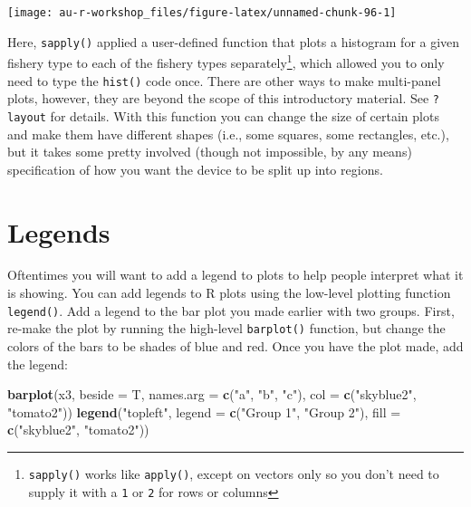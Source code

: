 \documentclass[]{book}
\newenvironment{Shaded}{\begin{snugshade}}{\end{snugshade}}
\newcommand{\KeywordTok}[1]{\textcolor[rgb]{0.13,0.29,0.53}{\textbf{#1}}}
\newcommand{\DataTypeTok}[1]{\textcolor[rgb]{0.13,0.29,0.53}{#1}}
\newcommand{\StringTok}[1]{\textcolor[rgb]{0.31,0.60,0.02}{#1}}
\newcommand{\NormalTok}[1]{#1}
\let\rmarkdownfootnote\footnote%
\def\footnote{\protect\rmarkdownfootnote}
\theoremstyle{definition}
\theoremstyle{definition}
\theoremstyle{definition}
\theoremstyle{remark}
\begin{document}
\begin{center}\texttt{[image: au-r-workshop\_files/figure-latex/unnamed-chunk-96-1]} \end{center}

Here, \texttt{sapply()} applied a user-defined function that plots a
histogram for a given fishery type to each of the fishery types
separately\footnote{\texttt{sapply()} works like \texttt{apply()},
  except on vectors only so you don't need to supply it with a
  \texttt{1} or \texttt{2} for rows or columns}, which allowed you to
only need to type the \texttt{hist()} code once. There are other ways to
make multi-panel plots, however, they are beyond the scope of this
introductory material. See \texttt{?layout} for details. With this
function you can change the size of certain plots and make them have
different shapes (i.e., some squares, some rectangles, etc.), but it
takes some pretty involved (though not impossible, by any means)
specification of how you want the device to be split up into regions.

\section{Legends}\label{legends}

Oftentimes you will want to add a legend to plots to help people
interpret what it is showing. You can add legends to R plots using the
low-level plotting function \texttt{legend()}. Add a legend to the bar
plot you made earlier with two groups. First, re-make the plot by
running the high-level \texttt{barplot()} function, but change the
colors of the bars to be shades of blue and red. Once you have the plot
made, add the legend:

\begin{Shaded}
\begin{Highlighting}[]
\KeywordTok{barplot}\NormalTok{(x3, }\DataTypeTok{beside =}\NormalTok{ T, }
        \DataTypeTok{names.arg =} \KeywordTok{c}\NormalTok{(}\StringTok{"a"}\NormalTok{, }\StringTok{"b"}\NormalTok{, }\StringTok{"c"}\NormalTok{),}
        \DataTypeTok{col =} \KeywordTok{c}\NormalTok{(}\StringTok{"skyblue2"}\NormalTok{, }\StringTok{"tomato2"}\NormalTok{))}
\KeywordTok{legend}\NormalTok{(}\StringTok{"topleft"}\NormalTok{, }\DataTypeTok{legend =} \KeywordTok{c}\NormalTok{(}\StringTok{"Group 1"}\NormalTok{, }\StringTok{"Group 2"}\NormalTok{),}
       \DataTypeTok{fill =} \KeywordTok{c}\NormalTok{(}\StringTok{"skyblue2"}\NormalTok{, }\StringTok{"tomato2"}\NormalTok{))}
\end{Highlighting}
\end{Shaded}
\end{document}
